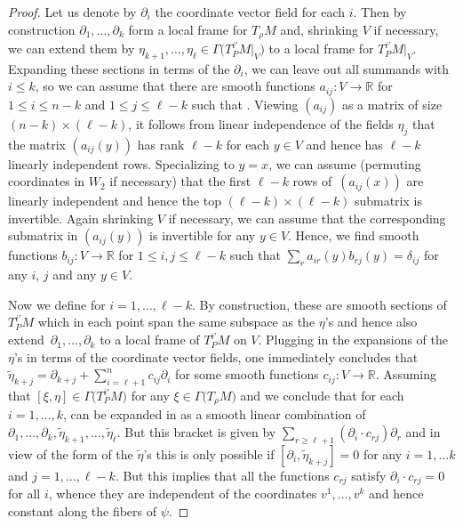 \documentclass[pdftex]{sigma}
\numberwithin{equation}{section}
\def\Bbb{\mathbb}
\newcommand{\x}{\times}
\newcommand{\Ga}{\Gamma}
\begin{document}
\begin{proof}
Let us denote by $\partial_i$ the coordinate vector field
 for each $i$. Then by construction
$\partial_1,\dots,\partial_k$ form a local frame for $T_\rho M$ and, shrinking $V$ if
necessary, we can extend them by $\eta_{k+1},\dots,\eta_{\ell}\in\Ga\bigl(T^{i'}_PM|_V\bigr)$
to a local frame for $T^{i'}_PM|_V$. Expanding these sections in terms of the
$\partial_i$, we can leave out all summands with $i\leq k$, so we can assume that
there are smooth functions $a_{ij}\colon V\to\Bbb R$ for $1\leq i\leq n-k$ and
$1\leq j\leq\ell-k$ such that
. Viewing $(a_{ij})$ as a matrix of
size $(n-k)\x (\ell-k)$, it follows from linear independence of the fields $\eta_j$
that the matrix $(a_{ij}(y))$ has rank $\ell-k$ for each $y\in V$ and hence has
$\ell-k$ linearly independent rows. Specializing to $y=x$, we can assume (permuting
coordinates in $W_2$ if necessary) that the first $\ell-k$ rows of~$(a_{ij}(x))$ are
linearly independent and hence the top $(\ell-k)\x(\ell-k)$ submatrix is
invertible. Again shrinking $V$ if necessary, we can assume that the corresponding
submatrix in $(a_{ij}(y))$ is invertible for any $y\in V$. Hence, we find smooth
functions $b_{ij}\colon V\to\Bbb R$ for $1\leq i,j\leq \ell-k$ such that
$\sum_r a_{ir}(y)b_{rj}(y)=\delta_{ij}$ for any $i$, $j$ and any $y\in V$.

Now we define  for
$i=1,\dots,\ell-k$. By construction, these are smooth sections of $T^{i'}_PM$ which in
each point span the same subspace as the $\eta$'s and hence also extend~$\partial_1,\dots,\partial_k$
to a local frame of $T^{i'}_PM$ on $V$. Plugging in the
expansions of the $\eta$'s in terms of the coordinate vector fields, one immediately
concludes that $\tilde\eta_{k+j}=\partial_{k+j}+\sum_{i=\ell+1}^nc_{ij}\partial_i$
for some smooth functions $c_{ij}\colon V\to\Bbb R$. Assuming that
$[\xi,\eta]\in\Ga\bigl(T^{i'}_PM\bigr)$ for any $\xi\in\Ga\bigl(T_\rho M\bigr)$ and
\smash{$\eta\in\Ga\bigl(T^{i'}_PM\bigr)$} we conclude that for each $i=1,\dots,k$,
 can be expanded in as a smooth linear combination of
$\partial_1,\dots,\partial_k,\tilde\eta_{k+1},\dots,\tilde\eta_{\ell}$. But this
bracket is given by $\sum_{r\geq\ell+1}(\partial_i\cdot c_{rj})\partial_r$ and in
view of the form of the $\tilde\eta$'s this is only possible if
$[\partial_i,\tilde\eta_{k+j}]=0$ for any $i=1,\dots k$ and $j=1,\dots,\ell-k$. But
this implies that all the functions $c_{rj}$ satisfy $\partial_i\cdot c_{rj}=0$ for
all $i$, whence they are independent of the coordinates $v^1,\dots,v^k$ and hence
constant along the fibers of $\psi$.


\end{proof}
\end{document}
